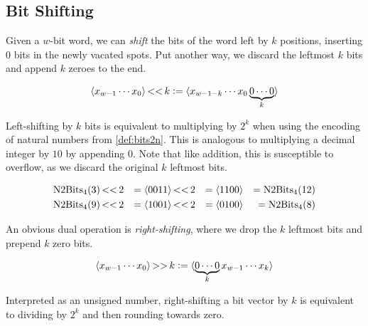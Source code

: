 \subsection{Bit Shifting}
\label{sec:bitshift}

Given a $w$-bit word, we can \emph{shift} the bits of the word left by
$k$ positions, inserting $0$ bits in the newly vacated spots.  Put
another way, we discard the leftmost $k$ bits and append $k$ zeroes to
the end.

\begin{definition}
  \begin{align*}
  \langle x_{w-1}\cdots{}x_{0} \rangle \operatorname{<<} k \vcentcolon=
  \langle x_{w-1-k}\cdots{}x_{0} \underbrace{0\cdots 0}_{k} \rangle
  \end{align*}
  \label{def:bits-leftshift}
\end{definition}

Left-shifting by $k$ bits is equivalent to multiplying by $2^{k}$ when
using the encoding of natural numbers from \cref{def:bits2n}.  This is
analogous to multiplying a decimal integer by $10$ by appending $0$.
Note that like addition, this is susceptible to overflow, as we
discard the original $k$ leftmost bits.

\begin{example}[Left-shifting bit vectors with $w=4$]
  \begin{align}
    \mathrm{N2Bits}_{4}(3) \operatorname{<<} 2 &&= \langle 0011 \rangle \operatorname{<<} 2 &&= \langle 1100 \rangle &&= \mathrm{N2Bits}_{4}(12) \\
    \mathrm{N2Bits}_{4}(9) \operatorname{<<} 2 &&= \langle 1001 \rangle \operatorname{<<} 2 &&= \langle 0100 \rangle &&= \mathrm{N2Bits}_{4}(8)
  \end{align}
\end{example}

An obvious dual operation is \emph{right-shifting}, where we drop the
$k$ leftmost bits and prepend $k$ zero bits.

\begin{definition}
  \begin{align*}
    \langle x_{w-1}\cdots{}x_{0} \rangle \operatorname{>>} k \vcentcolon=
    \langle \underbrace{0 \cdots 0}_{k} x_{w-1}\cdots{}x_{k} \rangle
  \end{align*}
  \label{def:bits-rightshift-logical}
\end{definition}

Interpreted as an unsigned number, right-shifting a bit vector by $k$
is equivalent to dividing by $2^{k}$ and then rounding towards zero.

